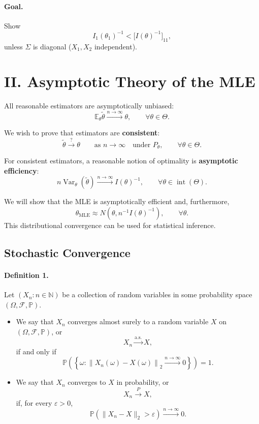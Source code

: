 \documentclass[11pt,a4paper]{article}
\begin{document}
\paragraph{Goal.}
Show
\[
I_1(\theta_1)^{-1}
<
\bigl[I(\theta)^{-1}\bigr]_{11},
\]
unless $\Sigma$ is diagonal ($X_1,X_2$ independent).

\section*{II. Asymptotic Theory of the MLE}

All reasonable estimators are asymptotically unbiased:
\[
\mathbb{E}_{\theta}\tilde{\theta}
\xrightarrow{n\to\infty}
\theta,
\qquad
\forall\theta\in\Theta.
\]

We wish to prove that estimators are \textbf{consistent}:
\[
\tilde{\theta}\xrightarrow{?}\theta
\qquad
\text{as }n\to\infty
\quad
\text{under }P_{\theta},
\qquad
\forall\theta\in\Theta.
\]

For consistent estimators, a reasonable notion of optimality is
\textbf{asymptotic efficiency}:
\[
n\operatorname{Var}_{\theta}(\tilde{\theta})
\xrightarrow{n\to\infty}
I(\theta)^{-1},
\qquad
\forall\theta\in\operatorname{int}(\Theta).
\]

We will show that the MLE is asymptotically efficient and, furthermore,
\[
\hat{\theta}_{\mathrm{MLE}}
\approx
N\left(\theta,n^{-1}I(\theta)^{-1}\right),
\qquad
\forall\theta.
\]
This distributional convergence can be used for statistical inference.

\subsection*{Stochastic Convergence}

\paragraph{Definition 1.}
Let $(X_n:n\in\mathbb{N})$ be a collection of random variables in some
probability space $(\Omega,\mathcal{F},\mathbb{P})$.

\begin{itemize}
    \item We say that $X_n$ converges almost surely to a random variable
    $X$ on $(\Omega,\mathcal{F},\mathbb{P})$, or
    \[
    X_n\xrightarrow{\mathrm{a.s.}}X,
    \]
    if and only if
    \[
    \mathbb{P}\left(
    \left\{
    \omega:
    \left\|X_n(\omega)-X(\omega)\right\|_2
    \xrightarrow{n\to\infty}0
    \right\}
    \right)
    =1.
    \]

    \item We say that $X_n$ converges to $X$ in probability, or
    \[
    X_n\xrightarrow{P}X,
    \]
    if, for every $\varepsilon>0$,
    \[
    \mathbb{P}\left(
    \|X_n-X\|_2>\varepsilon
    \right)
    \xrightarrow{n\to\infty}0.
    \]
\end{itemize}
\end{document}
